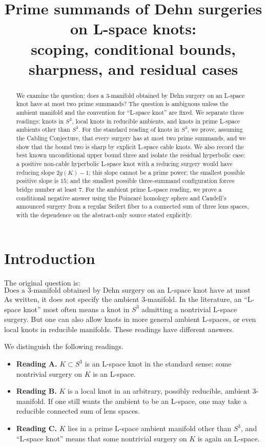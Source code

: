\documentclass[12pt]{article}
\title{Prime summands of Dehn surgeries on L-space knots:\\
scoping, conditional bounds, sharpness, and residual cases}
\author{}
\date{}
\theoremstyle{definition}
\begin{document}
\maketitle

\begin{abstract}
We examine the question: does a 3-manifold obtained by Dehn surgery on an L-space knot have at most two prime summands?  The question is ambiguous unless the ambient manifold and the convention for ``L-space knot'' are fixed.  We separate three readings: knots in \(S^3\), local knots in reducible ambients, and knots in prime L-space ambients other than \(S^3\).  For the standard reading of knots in \(S^3\), we prove, assuming the Cabling Conjecture, that every surgery has at most two prime summands, and we show that the bound two is sharp by explicit L-space cable knots.  We also record the best known unconditional upper bound three and isolate the residual hyperbolic case: a positive non-cable hyperbolic L-space knot with a reducing surgery would have reducing slope \(2g(K)-1\); this slope cannot be a prime power; the smallest possible positive slope is \(15\); and the smallest possible three-summand configuration forces bridge number at least \(7\).  For the ambient prime L-space reading, we prove a conditional negative answer using the Poincaré homology sphere and Caudell's announced surgery from a regular Seifert fiber to a connected sum of three lens spaces, with the dependence on the abstract-only source stated explicitly.
\end{abstract}

\section{Introduction}
\label{sec:intro}
The original question is:
\[
\text{Does a 3-manifold obtained by Dehn surgery on an L-space knot have at most two prime summands?}
\]
As written, it does not specify the ambient 3-manifold.  In the literature, an ``L-space knot'' most often means a knot in \(S^3\) admitting a nontrivial L-space surgery.  But one can also allow knots in more general ambient L-spaces, or even local knots in reducible manifolds.  These readings have different answers.

We distinguish the following readings.
\begin{itemize}
  \item \textbf{Reading A.} \(K\subset S^3\) is an L-space knot in the standard sense: some nontrivial surgery on \(K\) is an L-space.
  \item \textbf{Reading B.} \(K\) is a local knot in an arbitrary, possibly reducible, ambient 3-manifold.  If one still wants the ambient to be an L-space, one may take a reducible connected sum of lens spaces.
  \item \textbf{Reading C.} \(K\) lies in a prime L-space ambient manifold other than \(S^3\), and ``L-space knot'' means that some nontrivial surgery on \(K\) is again an L-space.
\end{itemize}
\end{document}

